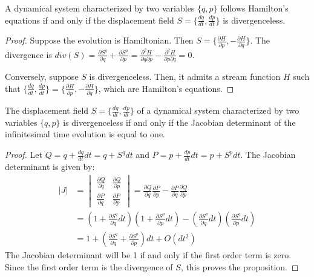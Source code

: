 \documentclass[10pt,twocolumn, nofootinbib]{revtex4-2}
\begin{document}
\begin{prop}
	A dynamical system characterized by two variables $\{q, p\}$ follows Hamilton's equations if and only if the displacement field $S=\{\frac{dq}{dt}, \frac{dp}{dt} \}$ is divergenceless.
\end{prop}

\begin{proof}
	Suppose the evolution is Hamiltonian. Then $S=\{\frac{\partial H}{\partial p}, - \frac{\partial H}{\partial q} \}$. The divergence is $div(S) = \frac{\partial S^q}{\partial q} + \frac{\partial S^p}{\partial p} = \frac{\partial^2 H}{\partial q\partial p} - \frac{\partial^2H}{\partial p\partial q} = 0$.
	
	Conversely, suppose $S$ is divergenceless. Then, it admits a stream function $H$ such that $\{\frac{dq}{dt}, \frac{dp}{dt}\} = \{\frac{\partial H}{\partial p}, - \frac{\partial H}{\partial q} \}$, which are Hamilton's equations.
\end{proof}

\begin{prop}
	The displacement field $S=\{\frac{dq}{dt}, \frac{dp}{dt} \}$ of a dynamical system characterized by two variables $\{q, p\}$ is divergenceless if and only if the Jacobian determinant of the infinitesimal time evolution is equal to one.
\end{prop}

\begin{proof}
	Let $Q = q + \frac{dq}{dt} dt = q + S^q dt$ and $P = p + \frac{dp}{dt} dt = p + S^p dt$. The Jacobian determinant is given by:
	\begin{align*}
		|J| &= \begin{vmatrix}
			\frac{\partial Q}{\partial q} & \frac{\partial Q}{\partial p} \\
			\frac{\partial P}{\partial q} & \frac{\partial P}{\partial  p} 
		\end{vmatrix} = \frac{\partial Q}{\partial q} \frac{\partial P}{\partial  p} - \frac{\partial P}{\partial q} \frac{\partial Q}{\partial p} \\
		&= \left(1 + \frac{\partial S^q}{\partial  q}dt\right)\left(1 + \frac{\partial S^p}{\partial  p}dt\right) - \left(\frac{\partial S^p}{\partial  q}dt\right)\left(\frac{\partial S^q}{\partial  p}dt\right) \\
		&= 1 + \left(\frac{\partial S^q}{\partial  q} + \frac{\partial S^p}{\partial  p}\right)dt + O(dt^2)
	\end{align*}
	The Jacobian determinant will be 1 if and only if the first order term is zero. Since the first order term is the divergence of $S$, this proves the proposition.	
\end{proof}
\end{document}
